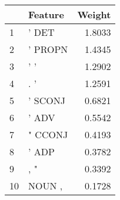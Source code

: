 \begin{tabular}{llr}
\toprule
{} &  Feature &  Weight \\
\midrule
1  &    ' DET &  1.8033 \\
2  &  ' PROPN &  1.4345 \\
3  &      ' ' &  1.2902 \\
4  &      . ' &  1.2591 \\
5  &  ' SCONJ &  0.6821 \\
6  &    ' ADV &  0.5542 \\
7  &  " CCONJ &  0.4193 \\
8  &    ' ADP &  0.3782 \\
9  &      , " &  0.3392 \\
10 &   NOUN , &  0.1728 \\
\bottomrule
\end{tabular}
